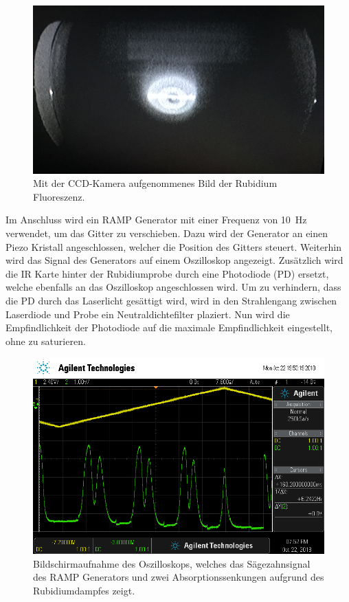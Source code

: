 \begin{figure}
	\centering
	\includegraphics[width=.6\textwidth]{images/florescence.JPG}
	\caption{Mit der CCD-Kamera aufgenommenes Bild der Rubidium Fluoreszenz.}
	\label{fig:RbFlorescence}
\end{figure}

Im Anschluss wird ein RAMP Generator mit einer Frequenz von \SI{10}{\hertz} verwendet,
um das Gitter zu verschieben. Dazu wird der Generator an einen Piezo Kristall
angeschlossen, welcher die Position des Gitters steuert. Weiterhin wird
das Signal des Generators auf einem Oszilloskop angezeigt.
Zusätzlich wird die IR Karte hinter der Rubidiumprobe durch eine Photodiode (PD)
ersetzt, welche ebenfalls an das Oszilloskop angeschlossen wird.
Um zu verhindern, dass die PD durch das Laserlicht gesättigt wird, wird
in den Strahlengang zwischen Laserdiode und Probe ein Neutraldichtefilter plaziert.
Nun wird die Empfindlichkeit der Photodiode auf die maximale Empfindlichkeit
eingestellt, ohne zu saturieren.

\begin{figure}
	\centering
	\includegraphics[width=.8\textwidth]{images/first-signal.png}
	\caption{Bildschirmaufnahme des Oszilloskops, welches das Sägezahnsignal des
	RAMP Generators und zwei Absorptionssenkungen aufgrund des Rubidiumdampfes zeigt.}
	\label{fig:first-signal}
\end{figure}

